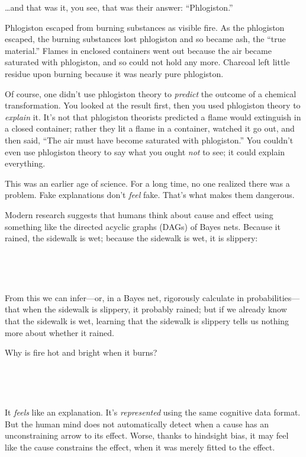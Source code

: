 {
 \ldots and that was it, you see, that was their answer:
``Phlogiston.''}

{
 Phlogiston escaped from burning substances as visible fire. As the
phlogiston escaped, the burning substances lost phlogiston and so
became ash, the ``true material.''
Flames in enclosed containers went out because the air became saturated
with phlogiston, and so could not hold any more. Charcoal left little
residue upon burning because it was nearly pure phlogiston.}

{
 Of course, one didn't use phlogiston theory to
\textit{predict} the outcome of a chemical transformation. You looked
at the result first, then you used phlogiston theory to
\textit{explain} it. It's not that phlogiston theorists
predicted a flame would extinguish in a closed container; rather they
lit a flame in a container, watched it go out, and then said,
``The air must have become saturated with
phlogiston.'' You couldn't even use
phlogiston theory to say what you ought \textit{not} to see; it could
explain everything.}

{
 This was an earlier age of science. For a long time, no one
realized there was a problem. Fake explanations don't
\textit{feel} fake. That's what makes them dangerous.}

{
 Modern research suggests that humans think about cause and effect
using something like the directed acyclic graphs (DAGs) of Bayes nets.
Because it rained, the sidewalk is wet; because the sidewalk is wet, it
is slippery:}

{
 ~}


{
 ~}

{
 From this we can infer---or, in a Bayes net, rigorously calculate
in probabilities---that when the sidewalk is slippery, it probably
rained; but if we already know that the sidewalk is wet, learning that
the sidewalk is slippery tells us nothing more about whether it
rained.}

{
 Why is fire hot and bright when it burns?}

{
 ~}


{
 ~}

{
 It \textit{feels} like an explanation. It's
\textit{represented} using the same cognitive data format. But the
human mind does not automatically detect when a cause has an
unconstraining arrow to its effect. Worse, thanks to hindsight bias, it
may feel like the cause constrains the effect, when it was merely
fitted to the effect.}

